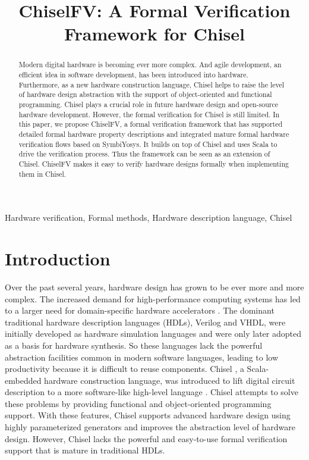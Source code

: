 \documentclass[conference]{IEEEtran}
\theoremstyle{definition}
\begin{document}
\title{ChiselFV: A Formal Verification Framework for Chisel
}


\maketitle

\begin{abstract}
    Modern digital hardware is becoming ever more complex. And agile development, an efficient idea in software development, has been introduced into hardware. Furthermore, as a new hardware construction language, Chisel helps to raise the level of hardware design abstraction with the support of object-oriented and functional programming. Chisel plays a crucial role in future hardware design and open-source hardware development. However, the formal verification for Chisel is still limited. In this paper, we propose ChiselFV, a formal verification framework that has supported detailed formal hardware property descriptions and integrated mature formal hardware verification flows based on SymbiYosys. It builds on top of Chisel and uses Scala to drive the verification process. Thus the framework can be seen as an extension of Chisel. ChiselFV makes it easy to verify hardware designs formally when implementing them in Chisel.
\end{abstract}

\begin{IEEEkeywords}
    Hardware verification, Formal methods, Hardware description language, Chisel
\end{IEEEkeywords}

\section{Introduction}
Over the past several years, hardware design has grown to be ever more and more complex. The increased demand for high-performance computing systems has led to a larger need for domain-specific hardware accelerators \cite{dally2020domain}.
The dominant traditional hardware description languages (HDLs), Verilog and VHDL, were initially developed as hardware simulation languages and were only later adopted as a basis for hardware synthesis. So these languages lack the powerful abstraction facilities common in modern software languages, leading to low productivity because it is difficult to reuse components.
Chisel \cite{bachrach2012chisel}, a Scala-embedded hardware construction language, was introduced to lift digital circuit description to a more software-like high-level language \cite{dobis2021chiselverify}.
Chisel attempts to solve these problems by providing functional and object-oriented programming support. With these features, Chisel supports advanced hardware design using highly parameterized generators and improves the abstraction level of hardware design. However, Chisel lacks the powerful and easy-to-use formal verification support that is mature in traditional HDLs.
\end{document}
